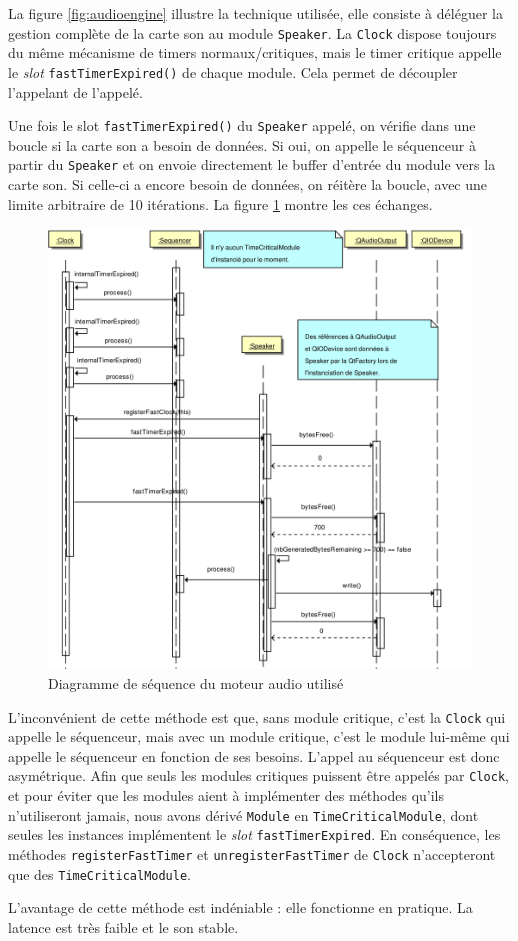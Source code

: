 La figure \ref{fig:audioengine} illustre la technique utilisée,
elle consiste à déléguer la gestion complète de la
carte son au module \verb!Speaker!. La \verb!Clock! dispose
toujours du même mécanisme de timers normaux/critiques, mais le
timer critique appelle le \emph{slot} \verb!fastTimerExpired()! de
chaque module. Cela permet de découpler l'appelant de l'appelé.

Une fois le slot \verb!fastTimerExpired()! du \verb!Speaker!
appelé, on vérifie dans une boucle si la carte son a besoin de
données. Si oui, on appelle le séquenceur à partir du
\verb!Speaker! et on envoie directement le buffer d'entrée du
module vers la carte son. Si celle-ci a encore besoin de données,
on réitère la boucle, avec une limite arbitraire de 10 itérations.
La figure \ref{fig:audioengine-sequence} montre les ces échanges.

\begin{figure}[p]
\centering
\includegraphics[width=17cm]{../img/ps/psm_currentAudioEngine_Sequence.pdf}
\caption{Diagramme de séquence du moteur audio utilisé}
\label{fig:audioengine-sequence}
\end{figure}

L'inconvénient de cette méthode est que, sans module critique,
c'est la \verb!Clock! qui appelle le séquenceur, mais avec un
module critique, c'est le module lui-même qui appelle le séquenceur
en fonction de ses besoins. L'appel au séquenceur est donc
asymétrique. Afin que seuls les modules critiques puissent être
appelés par \verb!Clock!, et pour éviter que les modules aient à
implémenter des méthodes qu'ils n'utiliseront jamais, nous avons
dérivé \verb!Module! en \verb!TimeCriticalModule!, dont seules les
instances implémentent le \emph{slot} \verb!fastTimerExpired!. En
conséquence, les méthodes \verb!registerFastTimer! et
\verb!unregisterFastTimer! de \verb!Clock! n'accepteront que des
\verb!TimeCriticalModule!.

L'avantage de cette méthode est indéniable : elle fonctionne en
pratique. La latence est très faible et le son stable.
